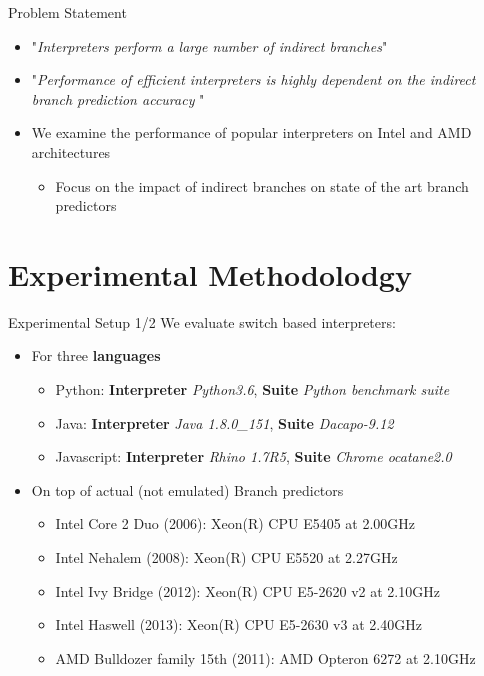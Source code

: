\documentclass[10pt]{beamer}
\begin{document}
\begin{frame}{Problem Statement}
    \begin{itemize}
    	\item{"\textit{Interpreters perform a large number of indirect branches}"} \footnotemark
        \item{"\textit{Performance of efficient interpreters is highly dependent on the indirect branch prediction accuracy }"} \footnotemark[1]
        \item{We examine the performance of popular interpreters on Intel and AMD architectures}
	         \begin{itemize}
	         	\item {Focus on the impact of indirect branches on state of the art branch predictors }
	         \end{itemize}
    \end{itemize}
    
\end{frame}

\section{Experimental Methodolodgy}
\begin{frame}{Experimental Setup 1/2}
	We evaluate switch based interpreters:
	\begin{itemize}
		\item {For three \textbf{languages}}
			\begin{itemize}
				\item {Python: \textbf{Interpreter} \textit{Python3.6}, \textbf{Suite} \textit{Python benchmark suite\footnotemark[2]}} 
				\item {Java: \textbf{Interpreter} \textit{Java 1.8.0\_151}, \textbf{Suite} \textit{Dacapo-9.12}} 
				\item {Javascript: \textbf{Interpreter} \textit{Rhino 1.7R5}, \textbf{Suite} \textit{Chrome ocatane2.0}}
			\end{itemize}
		\item {On top of actual (not emulated) Branch predictors}
		\begin{itemize}
			\item {Intel Core 2 Duo (2006): Xeon(R) CPU E5405 at 2.00GHz} 
			\item {Intel Nehalem (2008): Xeon(R) CPU E5520 at 2.27GHz} 
			\item {Intel Ivy Bridge (2012): Xeon(R) CPU E5-2620 v2 at 2.10GHz} 
			\item {Intel Haswell (2013): Xeon(R) CPU E5-2630 v3 at 2.40GHz} 
			\item {AMD Bulldozer family 15th (2011): AMD Opteron 6272 at 2.10GHz}
		\end{itemize}
		
	\end{itemize}
\end{frame}
\end{document}
